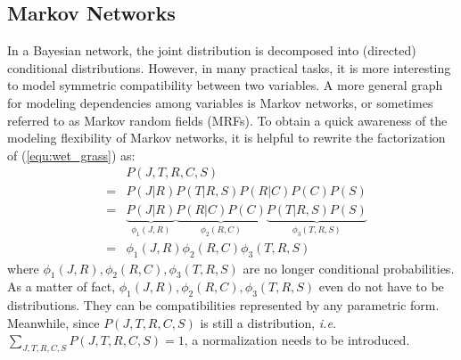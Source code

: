 \subsection{Markov Networks}
In a Bayesian network, the joint distribution is decomposed into (directed) conditional distributions. However, in many practical tasks, it is more interesting 
to model symmetric compatibility between two variables.           
A more general graph for modeling dependencies among variables is Markov networks, or sometimes referred to as Markov random fields (MRFs).      
To obtain a quick awareness of the modeling flexibility of Markov networks, it is helpful to rewrite the factorization of (\ref{equ:wet_grass}) as:    
\begin{equation}
 \begin{array}{rcl}
   & & P(J,T,R,C,S)\\
   &=& P(J|R)P(T|R,S)P(R|C)P(C)P(S) \\
   &=& \underbrace{P(J|R)}_{\phi_1(J,R)} \underbrace{P(R|C)P(C)}_{\phi_2(R,C)} \underbrace{P(T|R,S)P(S)}_{\phi_3(T,R,S)}\\
   &=& \phi_1(J,R)\phi_2(R,C)\phi_3(T,R,S)
 \end{array}
 \label{equ:BN2MN}
\end{equation}
where $\phi_1(J,R), \phi_2(R,C),\phi_3(T,R,S)$ are no longer conditional probabilities. As a matter of fact, $\phi_1(J,R), \phi_2(R,C),\phi_3(T,R,S)$ even 
do not have to be distributions. They can be compatibilities represented by any parametric form. Meanwhile, since $P(J,T,R,C,S)$ is still a distribution, 
\emph{i.e.} $\sum_{J,T,R,C,S}P(J,T,R,C,S)=1$, a normalization needs to be introduced.   

